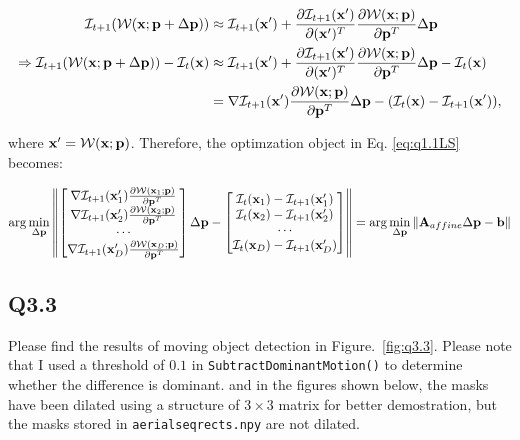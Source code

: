 \documentclass[11pt]{article}
\newcommand{\code}[1]{\texttt{#1}}
\begin{document}
\begin{align} \label{general_warping_expansion}
    \mathcal{I}_{t+1}(\mathcal{W}(\mathbf{x};\mathbf{p}+\Delta \mathbf{p}))
    & \approx
    \mathcal{I}_{t+1}(\mathbf{x}')+
    \frac{\partial \mathcal{I}_{t+1}(\mathbf{x}')}{\partial(\mathbf{x}')^T}
    \frac{\partial \mathcal{W}(\mathbf{x}; \mathbf{p})} {\partial \mathbf{p}^T} \Delta \mathbf{p}
    \\ \Rightarrow
    \mathcal{I}_{t+1}(\mathcal{W}(\mathbf{x};\mathbf{p}+\Delta \mathbf{p})) - \mathcal{I}_t(\mathbf{x})
    & \approx
    \mathcal{I}_{t+1} (\mathbf{x}') +
    \frac {\partial \mathcal{I}_{t+1}(\mathbf{x}')} {\partial(\mathbf{x}')^T}
    \frac{\partial \mathcal{W}(\mathbf{x}; \mathbf{p})} {\partial \mathbf{p}^T}
    \Delta \mathbf{p} - \mathcal{I}_t(\mathbf{x}) \\
    &= \nabla \mathcal{I}_{t+1}(\mathbf{x}')
    \frac{\partial \mathcal{W}(\mathbf{x}; \mathbf{p})} {\partial \mathbf{p}^T}
    \Delta \mathbf{p} - (\mathcal{I}_t(\mathbf{x}) - \mathcal{I}_{t+1} (\mathbf{x}')),
\end{align}

where $\mathbf{x}'=\mathcal{W}(\mathbf{x};\mathbf{p})$. Therefore, the optimzation object in Eq. \ref{eq:q1.1LS} becomes:

\begin{equation} \label{general_optimization_object}
    \arg\min_{\Delta \mathbf{p}}
    \left \|
    \begin{bmatrix}
        \nabla \mathcal{I}_{t+1}(\mathbf{x}_1') \frac{\partial\mathcal{W}(\mathbf{x}_1;\mathbf{p})}{\partial \mathbf{p}^T} \\
        \nabla \mathcal{I}_{t+1}(\mathbf{x}_2') \frac{\partial\mathcal{W}(\mathbf{x}_2;\mathbf{p})}{\partial \mathbf{p}^T} \\
        \cdots\\
        \nabla \mathcal{I}_{t+1}(\mathbf{x}_D') \frac{\partial\mathcal{W}(\mathbf{x}_D;\mathbf{p})}{\partial \mathbf{p}^T}
    \end{bmatrix}
    \Delta \mathbf{p} -
    \begin{bmatrix}
        \mathcal{I}_t(\mathbf{x}_1) - \mathcal{I}_{t+1} (\mathbf{x}_1')\\
        \mathcal{I}_t(\mathbf{x}_2) - \mathcal{I}_{t+1} (\mathbf{x}_2')\\
        \cdots\\
        \mathcal{I}_t(\mathbf{x}_D) - \mathcal{I}_{t+1} (\mathbf{x}_D')\\
    \end{bmatrix}
    \right \|
    =
    \arg\min_{\Delta \mathbf{p}}
    \| \mathbf{A}_{affine}\Delta\mathbf{p} - \mathbf{b} \|
\end{equation}

\newpage
\subsection*{Q3.3}

Please find the results of moving object detection in Figure.~\ref{fig:q3.3}. Please note that I used a threshold of $0.1$ in \code{SubtractDominantMotion()} to determine whether the difference is dominant. and in the figures shown below, the masks have been dilated using a structure of $3\times3$ matrix for better demostration, but the masks stored in \code{aerialseqrects.npy} are not dilated.
\end{document}
